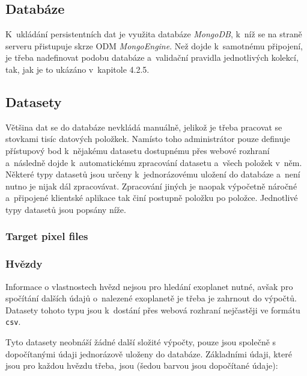 \documentclass[a4paper,12pt]{article}
\def\code#1{\texttt{#1}}
\begin{document}
{{{{{{{{


\subsection{Databáze}

K~ukládání persistentních dat je využita databáze \textit{MongoDB}, k~níž se na straně serveru přistupuje skrze ODM \textit{MongoEngine}. Než dojde k~samotnému připojení, je třeba nadefinovat podobu databáze a~validační pravidla jednotlivých kolekcí, tak, jak je to ukázáno v~kapitole 4.2.5.



\subsection{Datasety}

Většina dat se do databáze nevkládá manuálně, jelikož je třeba pracovat se stovkami tisíc datových položkek. Namísto toho administrátor pouze definuje přístupový bod k~nějakému datasetu dostupnému přes webové rozhraní a~následně dojde k~automatickému zpracování datasetu a~všech položek v~něm. Některé typy datasetů jsou určeny k~jednorázovému uložení do databáze a~není nutno je nijak dál zpracovávat. Zpracování jiných je naopak výpočetně náročné a~připojené klientské aplikace tak činí postupně položku po položce. Jednotlivé typy datasetů jsou popsány níže.

\subsubsection{Target pixel files}

\subsubsection{Hvězdy}

Informace o vlastnostech hvězd nejsou pro hledání exoplanet nutné, avšak pro spočítání dalších údajů o~nalezené exoplanetě je třeba je zahrnout do výpočtů. Datasety tohoto typu jsou k~dostání přes webová rozhraní nejčastěji ve formátu \code{csv}.


Tyto datasety neobnáší žádné další složité výpočty, pouze jsou společně s dopočítanými údaji jednorázově uloženy do databáze. Základními údaji, které jsou pro každou hvězdu třeba, jsou (šedou barvou jsou dopočítané údaje):

}}}}}}}}
\end{document}
